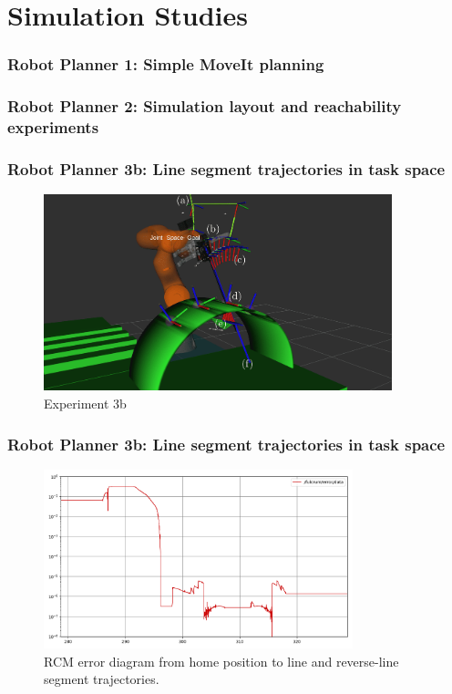 \section{Simulation Studies}

\begin{frame}
\frametitle{Robot Planner 1: Simple MoveIt planning}
\end{frame}

\begin{frame}
\frametitle{Robot Planner 2: Simulation layout and reachability experiments}
\end{frame}

\begin{frame}
\frametitle{Robot Planner 3b: Line segment trajectories in task space}
\begin{center}
\begin{figure}[!htb]
\centering
\includegraphics[width=0.9\textwidth]{../images/robot_planner3/3b_line_seg.png}
\caption{Experiment 3b}
\end{figure}
\end{center}
\end{frame}

\begin{frame}
\frametitle{Robot Planner 3b: Line segment trajectories in task space}
\begin{center}
\begin{figure}[!htb]
\centering
\includegraphics[width=0.8\textwidth]{../images/robot_planner3/robot_planner3b_error.png}
\caption{RCM error diagram from home position to line and reverse-line segment trajectories.}
\end{figure}
\end{center}
\end{frame}

